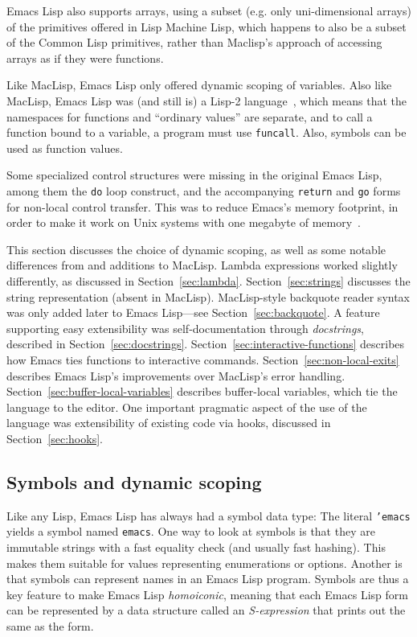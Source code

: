 \documentclass[format=acmsmall, review]{acmart}
\newcommand \Elisp {Emacs Lisp}
\begin{document}
\Elisp{} also supports arrays, using a subset (e.g. only uni-dimensional
arrays) of the primitives offered in Lisp Machine Lisp, which happens to
also be a subset of the Common Lisp primitives, rather than Maclisp's
approach of accessing arrays as if they were functions.


Like MacLisp, \Elisp{} only offered
dynamic scoping of variables.  Also like MacLisp, \Elisp{} was (and still is) a Lisp-2
language~\cite{SteeleGabriel1993}, which means that the namespaces for
functions and ``ordinary values'' are separate, and to call a function bound
to a variable, a program must use \texttt{funcall}.  Also, symbols can be
used as function values.

Some specialized control structures were missing in the original
\Elisp{}, among them the \texttt{do} loop construct, and the
accompanying \texttt{return} and \texttt{go} forms for non-local
control transfer.  This was to reduce Emacs's memory footprint, in
order to make it work on Unix systems with one megabyte of memory~\cite{Stallman2018-personal}.

This section discusses the choice of dynamic scoping, as well as
some notable differences from and additions to
MacLisp.  Lambda expressions worked slightly differently, as discussed
in Section~\ref{sec:lambda}.  Section~\ref{sec:strings} discusses the
string representation (absent in MacLisp).
MacLisp-style backquote reader syntax was only added later to \Elisp{}---see Section~\ref{sec:backquote}.
A feature supporting easy extensibility was self-documentation
through \emph{docstrings}, described in
Section~\ref{sec:docstrings}.
Section~\ref{sec:interactive-functions} describes how Emacs ties
functions to interactive commands.
Section~\ref{sec:non-local-exits} describes \Elisp{}'s improvements
over MacLisp's error handling.
Section~\ref{sec:buffer-local-variables} describes buffer-local
variables, which tie the language to the editor.  One important
pragmatic aspect of the use of the language was extensibility of
existing code via hooks, discussed in Section~\ref{sec:hooks}.

\subsection{Symbols and dynamic scoping}

Like any Lisp, \Elisp{} has always had a symbol data type: The literal
\texttt{'emacs} yields a symbol named \texttt{emacs}.  One way to look
at symbols is that they are immutable strings with a fast equality
check (and usually fast hashing).  This makes them suitable for values
representing enumerations or options.  Another is that symbols can
represent names in an \Elisp{} program.  Symbols are thus a key
feature to make \Elisp{} \textit{homoiconic}, meaning that each
\Elisp{} form can be represented by a data structure called an
\textit{S-expression} that prints out the same as the form.
\end{document}
